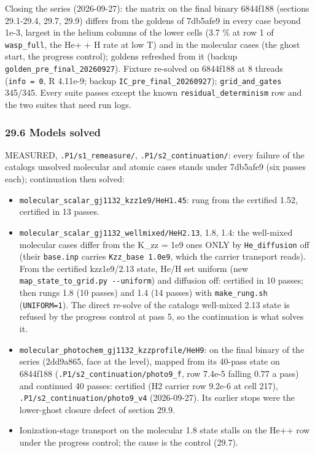 \documentclass[english,a4paper]{my_memo}
\providecommand{\tightlist}{\setlength{\itemsep}{0pt}\setlength{\parskip}{0pt}}
\begin{document}
Closing the series (2026-09-27): the matrix on the final binary 6844f188
(sections 29.1-29.4, 29.7, 29.9) differs from the goldens of 7db5afe9 in
every case beyond 1e-3, largest in the helium columns of the lower cells
(3.7 \% at row 1 of \texttt{wasp\_full}, the He+ + H rate at low T) and in the
molecular cases (the ghost start, the progress control); goldens refreshed
from it (backup \texttt{golden\_pre\_final\_20260927}). Fixture re-solved on 6844f188
at 8 threads (\texttt{info\ =\ 0}, \textbar\textbar R\textbar\textbar{} 4.11e-9; backup \texttt{IC\_pre\_final\_20260927});
\texttt{grid\_and\_gates} 345/345. Every suite passes except the known
\texttt{residual\_determinism} row and the two suites that need run logs.

\subsubsection{29.6 Models solved}\label{296-models-solved}

MEASURED, \texttt{.P1/s1\_remeasure/}, \texttt{.P1/s2\_continuation/}: every failure of the
catalog\textquotesingle s unsolved molecular and atomic cases stands under 7db5afe9 (six
passes each); continuation then solved:

\begin{itemize}
\tightlist
\item
  \texttt{molecular\_scalar\_gj1132\_kzz1e9/HeH1.45}: rung from the certified 1.52,
  certified in 13 passes.
\item
  \texttt{molecular\_scalar\_gj1132\_wellmixed/HeH2.13}, 1.8, 1.4: the well-mixed
  molecular cases differ from the K\_zz = 1e9 ones ONLY by \texttt{He\_diffusion}
  off (their \texttt{base.inp} carries \texttt{Kzz\_base\ 1.0e9}, which the carrier
  transport reads). From the certified kzz1e9/2.13 state, He/H set uniform
  (new \texttt{map\_state\_to\_grid.py\ -\/-uniform}) and diffusion off: certified in 10
  passes; then rungs 1.8 (10 passes) and 1.4 (14 passes) with
  \texttt{make\_rung.sh} (\texttt{UNIFORM=1}). The direct re-solve of the catalog\textquotesingle s
  well-mixed 2.13 state is refused by the progress control at pass 5, so
  the continuation is what solves it.
\item
  \texttt{molecular\_photochem\_gj1132\_kzzprofile/HeH9}: on the final binary of
  the series (2dd9a865, face at the level), mapped from its 40-pass state
  on 6844f188 (\texttt{.P1/s2\_continuation/photo9\_f}, row 7.4e-5 falling 0.77 a
  pass) and continued 40 passes: certified (H2 carrier row 9.2e-6 at cell
  217), \texttt{.P1/s2\_continuation/photo9\_v4} (2026-09-27). Its earlier stops were
  the lower-ghost closure defect of section 29.9.
\item
  Ionization-stage transport on the molecular 1.8 state stalls on the He++
  row under the progress control; the cause is the control (29.7).
\end{itemize}
\end{document}
